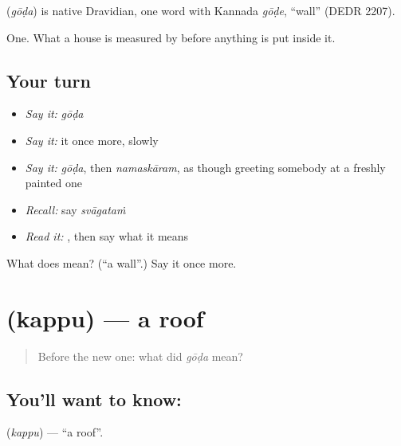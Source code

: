 \begin{cousinweb}
\textbf{} (\emph{gōḍa}) is native Dravidian, one word with Kannada \emph{gōḍe}, \textquotedblleft{}wall\textquotedblright{} (DEDR 2207).
\end{cousinweb}

\begin{grammarlens}[title={What you've built}]
One. What a house is measured by before anything is put inside it.
\end{grammarlens}

\subsection*{Your turn}
\begin{itemize}
\raggedright
  \item \emph{Say it:} \emph{gōḍa}
  \item \emph{Say it:} it once more, slowly
  \item \emph{Say it:} \emph{gōḍa}, then \emph{namaskāram}, as though greeting somebody at a freshly painted one
  \item \emph{Recall:} say \emph{svāgataṁ}
  \item \emph{Read it:} \textbf{}, then say what it means
\end{itemize}

\begin{tcolorbox}[breakable,colback=teal!4,colframe=teal!35!black,title={Before you move on}]
What does  mean? (\textquotedblleft{}a wall\textquotedblright{}.) Say it once more.
\end{tcolorbox}
\section[\texorpdfstring{\te{కప్పు} (kappu)}{కప్పు (kappu)}]{ (kappu) — a roof}

\label{lesson:TE-C67-roof}



\begin{quote}
Before the new one: what did \emph{gōḍa} mean?
\end{quote}

\subsection*{You'll want to know: }
\textbf{} (\emph{kappu}) — \textquotedblleft{}a roof\textquotedblright{}.

